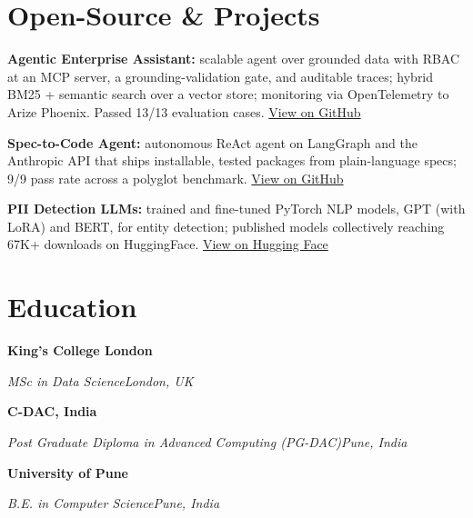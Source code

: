 \documentclass[10pt,a4paper]{article}
\newcommand{\entry}[4]{%
  {\color{company}\bfseries #1}\hfill {\color{muted}#2}\par
  \vspace{1pt}
  {\itshape #3}\hfill {\color{muted}\itshape #4}\par
  \vspace{3pt}%
}
\begin{document}
\section{Open-Source \& Projects}
\begin{tight}
  \item \textbf{Agentic Enterprise Assistant:} scalable agent over grounded data with RBAC at an MCP server, a grounding-validation gate, and auditable traces; hybrid BM25 + semantic search over a vector store; monitoring via OpenTelemetry to Arize Phoenix. Passed 13/13 evaluation cases. \href{https://github.com/abhijeetscode/Agentic-Enterprise-Assistant}{View on GitHub}
  \item \textbf{Spec-to-Code Agent:} autonomous ReAct agent on LangGraph and the Anthropic API that ships installable, tested packages from plain-language specs; 9/9 pass rate across a polyglot benchmark. \href{https://github.com/abhijeetscode/Spec-to-Code-Agent}{View on GitHub}
  \item \textbf{PII Detection LLMs:} trained and fine-tuned PyTorch NLP models, GPT (with LoRA) and BERT, for entity detection; published models collectively reaching 67K+ downloads on HuggingFace. \href{https://huggingface.co/ab-ai/pii_model}{View on Hugging Face}
\end{tight}

\section{Education}
\entry{King's College London}{}{MSc in Data Science}{London, UK}
\vspace{-3pt}
\entry{C-DAC, India}{}{Post Graduate Diploma in Advanced Computing (PG-DAC)}{Pune, India}
\vspace{-3pt}
\entry{University of Pune}{}{B.E. in Computer Science}{Pune, India}
\end{document}
